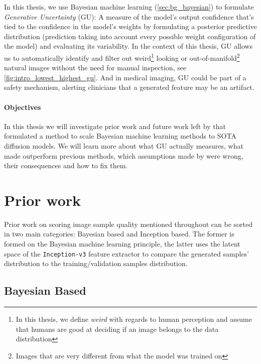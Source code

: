 In this thesis, we use Bayesian machine learning (\autoref{sec:bg_bayesian}) to formulate \textit{Generative Uncertainty} (\acs{GU}): A measure of the model's output confidence that's tied to the confidence in the model's weights by formulating a posterior predictive distribution (prediction taking into account every possible weight configuration of the model) and evaluating its variability. In the context of this thesis, \acs{GU} allows us to automatically identify and filter out weird\footnote{In this thesis, we define \textit{weird} with regards to human perception and assume that humans are good at deciding if an image belongs to the data distribution} looking or out-of-manifold\footnote{Images that are very different from what the model was trained on} natural images without the need for manual inspection, see \autoref{fig:intro_lowest_highest_gu}. And in medical imaging, \acs{GU} could be part of a safety mechanism, alerting clinicians that a generated feature may be an artifact.

\paragraph{Objectives}

In this thesis we will investigate prior work and future work left by \cite{jazbec_generative_2025} that formulated a method to scale Bayesian machine learning methods to \acs{SOTA} diffusion models. We will learn more about what \acs{GU} actually measures, what made \cite{jazbec_generative_2025} outperform previous methods, which assumptions made by \cite{jazbec_generative_2025} were wrong, their consequences and how to fix them.

\section{Prior work}

Prior work on scoring image sample quality mentioned throughout \cite{jazbec_generative_2025} can be sorted in two main categories: Bayesian based and Inception based.
The former is formed on the Bayesian machine learning principle, the latter uses the latent space of the \texttt{Inception-v3} feature extractor to compare the generated samples' distribution to the training/validation samples distribution.

\subsection{Bayesian Based}

